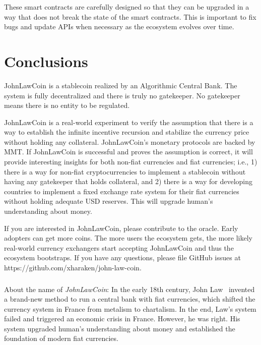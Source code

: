 \documentclass[dvipdfmx,a4paper]{article}
\begin{document}
These smart contracts are carefully designed so that they can be upgraded in a way that does not break the state of the smart contracts. This is important to fix bugs and update APIs when necessary as the ecosystem evolves over time.

\section{Conclusions}

JohnLawCoin is a stablecoin realized by an Algorithmic Central Bank. The system is fully decentralized and there is truly no gatekeeper. No gatekeeper means there is no entity to be regulated.

JohnLawCoin is a real-world experiment to verify the assumption that there is a way to establish the infinite incentive recursion and stabilize the currency price without holding any collateral. JohnLawCoin's monetary protocols are backed by MMT. If JohnLawCoin is successful and proves the assumption is correct, it will provide interesting insights for both non-fiat currencies and fiat currencies; i.e., 1) there is a way for non-fiat cryptocurrencies to implement a stablecoin without having any gatekeeper that holds collateral, and 2) there is a way for developing countries to implement a fixed exchange rate system for their fiat currencies without holding adequate USD reserves. This will upgrade human's understanding about money.

If you are interested in JohnLawCoin, please contribute to the oracle. Early adopters can get more coins. The more users the ecosystem gets, the more likely real-world currency exchangers start accepting JohnLawCoin and thus the ecosystem bootstraps. If you have any questions, please file GitHub issues at https://github.com/xharaken/john-law-coin.

\subsubsection*{}

About the name of \textit{JohnLawCoin}: In the early 18th century, John Law~\cite{davies2010history,ferguson2008ascent,iwai1997evolution} invented a brand-new method to run a central bank with fiat currencies, which shifted the currency system in France from metalism to chartalism. In the end, Law's system failed and triggered an economic crisis in France. However, he was right. His system upgraded human's understanding about money and established the foundation of modern fiat currencies.



\end{document}

